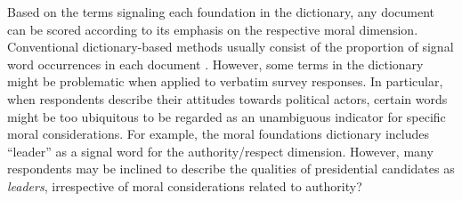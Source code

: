 \documentclass[12pt]{article}
\begin{document}
Based on the terms signaling each foundation in the dictionary, any document can be scored according to its emphasis on the respective moral dimension. Conventional dictionary-based methods usually consist of the proportion of signal word occurrences in each document \citep[e.g.][]{graham2009liberals}. However, some terms in the dictionary might be problematic when applied to verbatim survey responses. In particular, when respondents describe their attitudes towards political actors, certain words might be too ubiquitous to be regarded as an unambiguous indicator for specific moral considerations. For example, the moral foundations dictionary includes ``leader'' as a signal word for the authority/respect dimension. However, many respondents may be inclined to describe the qualities of presidential candidates as \textit{leaders}, irrespective of moral considerations related to authority?
\end{document}
